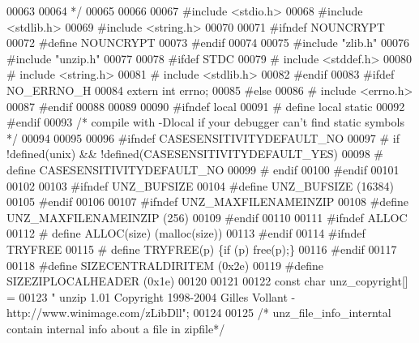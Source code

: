 \begin{DoxyCode}
00063 \textcolor{comment}{}
00064 \textcolor{comment}{*/}
00065 
00066 
00067 \textcolor{preprocessor}{#include <stdio.h>}
00068 \textcolor{preprocessor}{#include <stdlib.h>}
00069 \textcolor{preprocessor}{#include <string.h>}
00070 
00071 \textcolor{preprocessor}{#ifndef NOUNCRYPT}
00072 \textcolor{preprocessor}{        #define NOUNCRYPT}
00073 \textcolor{preprocessor}{#endif}
00074 
00075 \textcolor{preprocessor}{#include "zlib.h"}
00076 \textcolor{preprocessor}{#include "unzip.h"}
00077 
00078 \textcolor{preprocessor}{#ifdef STDC}
00079 \textcolor{preprocessor}{#  include <stddef.h>}
00080 \textcolor{preprocessor}{#  include <string.h>}
00081 \textcolor{preprocessor}{#  include <stdlib.h>}
00082 \textcolor{preprocessor}{#endif}
00083 \textcolor{preprocessor}{#ifdef NO\_ERRNO\_H}
00084     \textcolor{keyword}{extern} \textcolor{keywordtype}{int} errno;
00085 \textcolor{preprocessor}{#else}
00086 \textcolor{preprocessor}{#   include <errno.h>}
00087 \textcolor{preprocessor}{#endif}
00088 
00089 
00090 \textcolor{preprocessor}{#ifndef local}
00091 \textcolor{preprocessor}{#  define local static}
00092 \textcolor{preprocessor}{#endif}
00093 \textcolor{comment}{/* compile with -Dlocal if your debugger can't find static symbols */}
00094 
00095 
00096 \textcolor{preprocessor}{#ifndef CASESENSITIVITYDEFAULT\_NO}
00097 \textcolor{preprocessor}{#  if !defined(unix) && !defined(CASESENSITIVITYDEFAULT\_YES)}
00098 \textcolor{preprocessor}{#    define CASESENSITIVITYDEFAULT\_NO}
00099 \textcolor{preprocessor}{#  endif}
00100 \textcolor{preprocessor}{#endif}
00101 
00102 
00103 \textcolor{preprocessor}{#ifndef UNZ\_BUFSIZE}
00104 \textcolor{preprocessor}{#define UNZ\_BUFSIZE (16384)}
00105 \textcolor{preprocessor}{#endif}
00106 
00107 \textcolor{preprocessor}{#ifndef UNZ\_MAXFILENAMEINZIP}
00108 \textcolor{preprocessor}{#define UNZ\_MAXFILENAMEINZIP (256)}
00109 \textcolor{preprocessor}{#endif}
00110 
00111 \textcolor{preprocessor}{#ifndef ALLOC}
00112 \textcolor{preprocessor}{# define ALLOC(size) (malloc(size))}
00113 \textcolor{preprocessor}{#endif}
00114 \textcolor{preprocessor}{#ifndef TRYFREE}
00115 \textcolor{preprocessor}{# define TRYFREE(p) \{if (p) free(p);\}}
00116 \textcolor{preprocessor}{#endif}
00117 
00118 \textcolor{preprocessor}{#define SIZECENTRALDIRITEM (0x2e)}
00119 \textcolor{preprocessor}{#define SIZEZIPLOCALHEADER (0x1e)}
00120 
00121 
00122 \textcolor{keyword}{const} \textcolor{keywordtype}{char} unz\_copyright[] =
00123    \textcolor{stringliteral}{" unzip 1.01 Copyright 1998-2004 Gilles Vollant - http://www.winimage.com/zLibDll"};
00124 
00125 \textcolor{comment}{/* unz\_file\_info\_interntal contain internal info about a file in zipfile*/}

\end{DoxyCode}
